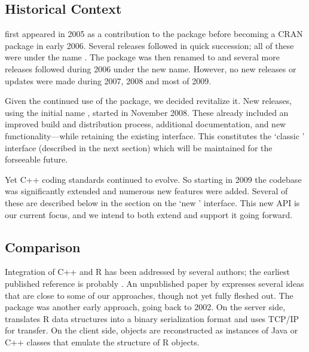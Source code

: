 \subsection{Historical Context}

 first appeared in 2005 as a contribution to the 
package \citep{eddelbuettelkhan09:rquantlib} before becoming a CRAN
package in early 2006. Several releases followed in quick succession; all of
these were under the name . The package was then renamed to
 and several more releases followed during 2006 under the
new name.  However, no new releases or updates were made during 2007, 2008
and most of 2009.

Given the continued use of the package, we decided revitalize it. New
releases, using the initial name , started in November 2008. These
already included an improved build and distribution process, additional
documentation, and new functionality---while retaining the existing
interface.  This constitutes the `classic ' interface (described in
the next section) which will be maintained for the forseeable future.

Yet C++ coding standards continued to evolve. So starting in 2009 the
codebase was significantly extended and numerous new features were added.
Several of these are described below in the section on the `new
' interface. This new API is our current focus, and we intend to
both extend and support it going forward.

\subsection{Comparison}

Integration of C++ and R has been addressed by several authors; the earliest
published reference is probably \cite{batesdebroy01:cppclasses}.
An unpublished paper by \cite{javagailemanly07:r_cpp} expresses several ideas
that are close to some of our approaches, though not yet fully fleshed out.
%
The  package \citep{cran:Rserve} was another early approach,
going back to 2002. On the server side,  translates R data
structures into a binary serialization format and uses TCP/IP for
transfer. On the client side, objects are reconstructed as instances of Java
or C++ classes that emulate the structure of R objects. 

